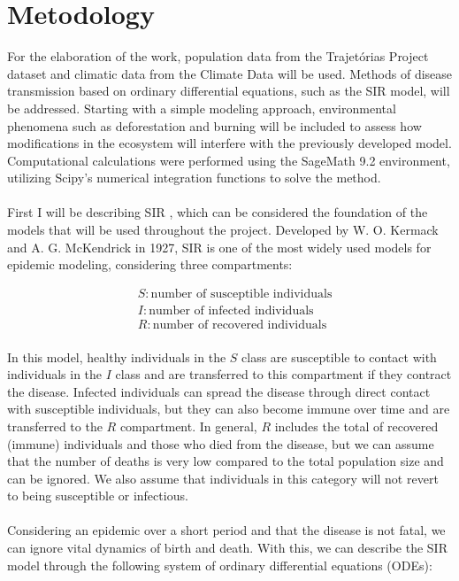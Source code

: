 \chapter{Metodology}

For the elaboration of the work, population data from the 
Trajetórias Project dataset and climatic data from the Climate 
Data will be used. Methods of disease transmission based on ordinary 
differential equations, such as the SIR model, will be addressed. 
Starting with a simple modeling approach, environmental phenomena 
such as deforestation and burning will be included to assess how 
modifications in the ecosystem will interfere with the previously 
developed model. Computational calculations were performed using 
the SageMath 9.2 environment, utilizing Scipy's numerical 
integration functions to solve the method.
\\\\
First I will be describing SIR \cite{githubMODBIO, Prasad2022}, 
which can be considered the foundation 
of the models that will be used throughout the project. 
Developed by W. O. Kermack and A. G. McKendrick in 1927, 
SIR is one of the most widely used models for epidemic 
modeling, considering three compartments:

\begin{align*}
    & S: \text{number of susceptible individuals} \\
    & I: \text{number of infected individuals} \\
    & R: \text{number of recovered individuals}
\end{align*}
\\
In this model, healthy individuals in the $S$ class are 
susceptible to contact with individuals in the $I$ class and 
are transferred to this compartment if they contract the disease. 
Infected individuals can spread the disease through 
direct contact with susceptible individuals, but they can 
also become immune over time and are transferred to the $R$ 
compartment. In general, $R$ includes the total of recovered (immune) 
individuals and those who died from the disease, but we can assume 
that the number of deaths is very low compared to the total 
population size and can be ignored. We also assume that individuals 
in this category will not revert to being susceptible or infectious.
\\\\
Considering an epidemic over a short period and 
that the disease is not fatal, we can ignore vital 
dynamics of birth and death. With this, we can describe 
the SIR model through the following system of ordinary 
differential equations (ODEs):

